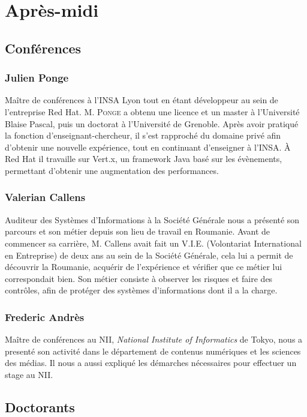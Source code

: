 \documentclass[12pt, a4paper]{report}
\begin{document}
\section{Après-midi}

\subsection{Conférences}

\subsubsection{Julien Ponge} Maître de conférences à l'INSA Lyon tout en étant développeur au sein de l'entreprise Red Hat. M. \textsc{Ponge} a obtenu une licence et un master à l'Université Blaise Pascal, puis un doctorat à l'Université de Grenoble. Après avoir pratiqué la fonction d'enseignant-chercheur, il s'est rapproché du domaine privé afin d'obtenir une nouvelle expérience, tout en continuant d'enseigner à l'INSA. À Red Hat il travaille sur Vert.x, un framework Java basé sur les évènements, permettant d'obtenir une augmentation des performances.

\subsubsection{Valerian Callens} Auditeur des Systèmes d'Informations à la Société Générale nous a présenté son parcours et son métier depuis son lieu de travail en Roumanie. Avant de commencer sa carrière, M. Callens avait fait un V.I.E. (Volontariat International en Entreprise) de deux ans au sein de la Société Générale, cela lui a permit de découvrir la Roumanie, acquérir de l'expérience et vérifier que ce métier lui correspondait bien. Son métier consiste à observer les risques et faire des contrôles, afin de protéger des systèmes d'informations dont il a la charge.

\subsubsection{Frederic Andrès} Maître de conférences au NII, \emph{National Institute of Informatics} de Tokyo, nous a presenté son activité dans le département de contenus numériques et les sciences des médias. Il nous a aussi expliqué les démarches nécessaires pour effectuer un stage au NII.


\subsection{Doctorants}
\end{document}
